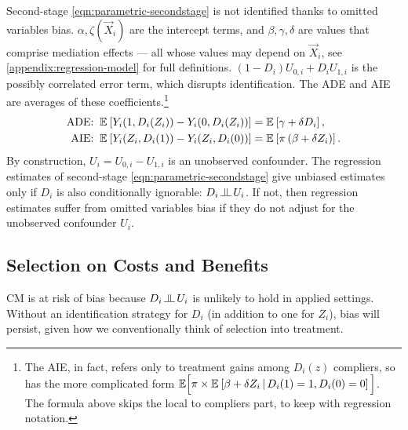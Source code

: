 Second-stage \eqref{eqn:parametric-secondstage} is not identified thanks to omitted variables bias.
$\alpha, \zeta(\vec X_i)$ are the intercept terms, and $\beta, \gamma, \delta$ are values that comprise mediation effects --- all whose values may depend on $\vec X_i$, see \autoref{appendix:regression-model} for full definitions.
$\left(1 - D_i \right)U_{0,i} + D_i U_{1,i}$ is the possibly correlated error term, which disrupts identification.
The ADE and AIE are averages of these coefficients.\footnote{
    The AIE, in fact, refers only to treatment gains among $D_i(z)$ compliers, so has the more complicated form $\mathbb E \Big[ 
        \pi \times \mathbb{E}_{} \left[ \beta +  \delta Z_i \, \middle\vert \, D_i(1) = 1, D_i(0) = 0 \right] \Big]$.
    The formula above skips the local to compliers part, to keep with regression notation.
}
\begin{align*}
    \text{ADE:} \;\; \mathbb{E}_{} \left[ Y_i(1, D_i(Z_i)) - Y_i(0, D_i(Z_i)) \right]
        &= \mathbb{E}_{} \left[ \gamma + \delta D_i \right], \\
    \text{AIE:} \;\; \mathbb{E}_{} \left[ Y_i(Z_i, D_i(1)) - Y_i(Z_i, D_i(0)) \right]
        &= \mathbb{E}_{} \left[  \pi \left( \beta +  \delta Z_i \right) \right].
\end{align*}
By construction, $U_i = U_{0, i} - U_{1, i}$ is an unobserved confounder.
The regression estimates of second-stage \eqref{eqn:parametric-secondstage} give unbiased estimates only if $D_i$ is also conditionally ignorable: $D_i \indep  U_i$.
If not, then regression estimates suffer from omitted variables bias if they do not adjust for the unobserved confounder $U_i$.

\subsection{Selection on Costs and Benefits}
CM is at risk of bias because $D_i \indep  U_i$ is unlikely to hold in applied settings.
Without an identification strategy for $D_i$ (in addition to one for $Z_i$), bias will persist, given how we conventionally think of selection into treatment.

